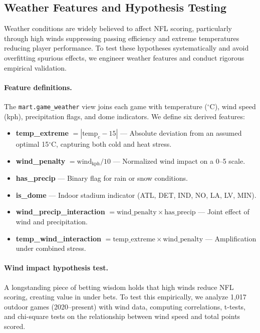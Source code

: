 \subsection{Weather Features and Hypothesis Testing}
\label{subsec:weather-features}

Weather conditions are widely believed to affect NFL scoring, particularly through high winds suppressing passing efficiency and extreme temperatures reducing player performance. To test these hypotheses systematically and avoid overfitting spurious effects, we engineer weather features and conduct rigorous empirical validation.

\paragraph{Feature definitions.}
The \texttt{mart.game\_weather} view joins each game with temperature ($^\circ$C), wind speed (kph), precipitation flags, and dome indicators. We define six derived features:
\begin{itemize}
  \item \textbf{temp\_extreme} $= |\text{temp}_c - 15|$ — Absolute deviation from an assumed optimal 15$^\circ$C, capturing both cold and heat stress.
  \item \textbf{wind\_penalty} $= \text{wind}_\text{kph} / 10$ — Normalized wind impact on a 0--5 scale.
  \item \textbf{has\_precip} — Binary flag for rain or snow conditions.
  \item \textbf{is\_dome} — Indoor stadium indicator (ATL, DET, IND, NO, LA, LV, MIN).
  \item \textbf{wind\_precip\_interaction} $= \text{wind\_penalty} \times \text{has\_precip}$ — Joint effect of wind and precipitation.
  \item \textbf{temp\_wind\_interaction} $= \text{temp\_extreme} \times \text{wind\_penalty}$ — Amplification under combined stress.
\end{itemize}

\paragraph{Wind impact hypothesis test.}
A longstanding piece of betting wisdom holds that high winds reduce NFL scoring, creating value in under bets. To test this empirically, we analyze 1,017 outdoor games (2020--present) with wind data, computing correlations, t-tests, and chi-square tests on the relationship between wind speed and total points scored.

